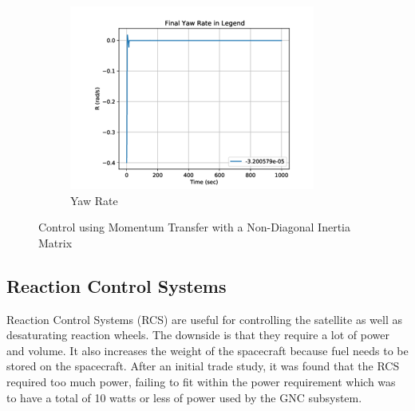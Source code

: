 \documentclass[conf]{new-aiaa}
\begin{document}
\begin{figure}[H]
\begin{subfigure}[b]{0.3\textwidth}
         \centering
         \includegraphics[width=\textwidth]{Figures/2StageControl/Yaw_NonDiaganol.png}
         \caption{Yaw Rate}
         \label{fig:NonDiagonal_Yaw}
     \end{subfigure}
        \caption{Control using Momentum Transfer with a Non-Diagonal Inertia Matrix}
        \label{fig:NonDiagonal_Inertia}
\end{figure}

\subsection{Reaction Control Systems}
Reaction Control Systems (RCS) are useful for controlling the satellite as well as desaturating reaction wheels. The downside is that they require a lot of power and volume. It also increases the weight of the spacecraft because fuel needs to be stored on the spacecraft. After an initial trade study, it was found that the RCS required too much power, failing to fit within the power requirement which was to have a total of 10 watts or less of power used by the GNC subsystem. 


\end{document}
